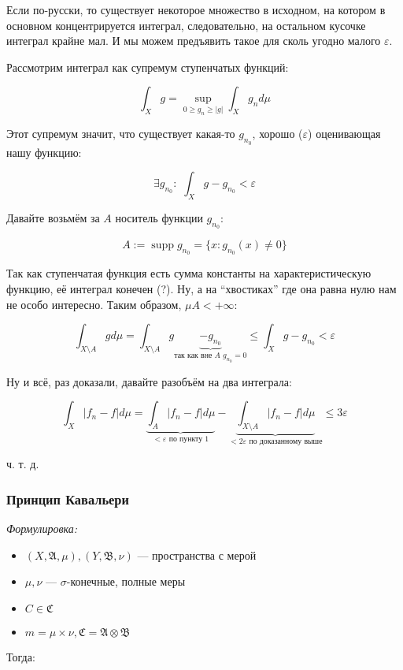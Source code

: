 \documentclass{article}
\def\dbl{\,\,}
\DeclareMathOperator{\supp}{supp}
\begin{document}
Если по-русски, то существует некоторое множество в исходном, на котором в основном концентрируется интеграл, следовательно, на остальном кусочке интеграл крайне мал. И мы можем предъявить такое для сколь угодно малого $\varepsilon$.

Рассмотрим интеграл как супремум ступенчатых функций:

\[\int_{X} g = \sup_{0 \ge g_n \ge |g|} \int_{X} g_n d\mu\]

Этот супремум значит, что существует какая-то $g_{n_0}$, хорошо ($\varepsilon$) оценивающая нашу функцию:

\[\exists g_{n_0}: \dbl \int_{X} g - g_{n_0} < \varepsilon\]

Давайте возьмём за $A$ носитель функции $g_{n_0}$:

\[A := \supp g_{n_0} = \{x: g_{n_0}(x) \neq 0\}\]

Так как ступенчатая функция есть сумма константы на характеристическую функцию, её интеграл конечен (?). Ну, а на ``хвостиках'' где она равна нулю нам не особо интересно. Таким образом, $\mu A < + \infty$:

\[\int_{X \setminus A} g d\mu = \int_{X \setminus A} g \underbrace{- g_{n_0}}_{\text{так как вне } A \,\, g_{n_0} = 0} \le \int_{X} g - g_{n_0} < \varepsilon\]

Ну и всё, раз доказали, давайте разобъём на два интеграла:

\[\int_{X} |f_n - f| d\mu = \underbrace{\int_{A} |f_n - f| d\mu}_{< \varepsilon \text{ по пункту 1}} - \underbrace{\int_{X \setminus A} |f_n - f| d\mu}_{<2 \varepsilon \text{ по доказанному выше}} \le 3 \varepsilon\]

ч. т. д. 

\subsubsection{Принцип Кавальери}
\textit{Формулировка:}

\begin{itemize}
    \item $(X, \mathfrak{A}, \mu), (Y, \mathfrak{B}, \nu)$ --- пространства с мерой
    \item $\mu, \nu$ --- $\sigma$-конечные, полные меры
    \item $C \in \mathfrak{C}$
    \item $m = \mu \times \nu, \mathfrak{C} = \mathfrak{A} \otimes \mathfrak{B}$
\end{itemize}

Тогда: 
\end{document}
